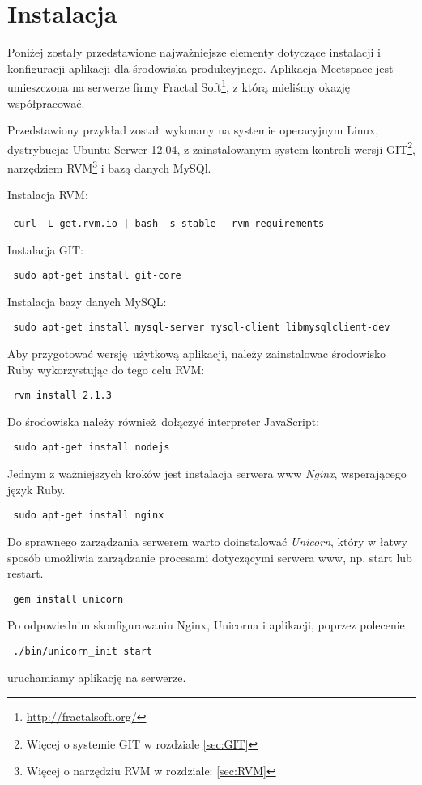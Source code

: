 \section{Instalacja}
Poniżej zostały przedstawione najważniejsze elementy dotyczące instalacji i konfiguracji aplikacji dla środowiska produkcyjnego. Aplikacja Meetspace jest umieszczona na serwerze firmy Fractal Soft\footnote{\url{http://fractalsoft.org/}}, z którą mieliśmy okazję współpracować.

Przedstawiony przykład został wykonany na systemie operacyjnym Linux, dystrybucja: Ubuntu Serwer 12.04, z zainstalowanym system kontroli wersji GIT\footnote{Więcej o systemie GIT w rozdziale \ref{sec:GIT}}, narzędziem RVM\footnote{Więcej o narzędziu RVM w rozdziale: \ref{sec:RVM}} i bazą danych MySQl.

Instalacja RVM:
\begin{center}
  \texttt{ curl -L get.rvm.io | bash -s stable }
  \texttt{ rvm requirements }
\end{center}

Instalacja GIT:
\begin{center}
  \texttt{ sudo apt-get install git-core }
\end{center}

Instalacja bazy danych MySQL:
\begin{center}
  \texttt{ sudo apt-get install mysql-server mysql-client libmysqlclient-dev }
\end{center}

Aby przygotować wersję użytkową aplikacji, należy zainstalowac środowisko Ruby wykorzystując do tego celu RVM:
\begin{center}
  \texttt{ rvm install 2.1.3 }
\end{center}
Do środowiska należy również dołączyć interpreter JavaScript:
\begin{center}
  \texttt{ sudo apt-get install nodejs }
\end{center}

\clearpage
Jednym z ważniejszych kroków jest instalacja serwera www \emph{Nginx}, wsperającego język Ruby.
\begin{center}
  \texttt{ sudo apt-get install nginx }
\end{center}

Do sprawnego zarządzania serwerem warto doinstalować \emph{Unicorn}, który w łatwy sposób umożliwia zarządzanie procesami dotyczącymi serwera www, np. start lub restart.
\begin{center}
  \texttt{ gem install unicorn }
\end{center}

Po odpowiednim skonfigurowaniu Nginx, Unicorna i aplikacji, poprzez polecenie
\begin{center}
  \texttt{ ./bin/unicorn\_init start }
\end{center}

uruchamiamy aplikację na serwerze.
